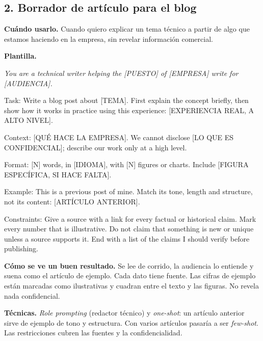 \documentclass[11pt,letterpaper]{article}
\newenvironment{prompt}{%
  \begin{center}\begin{minipage}{0.92\textwidth}\color{black!80}\small
  \setlength{\parskip}{0.4em}\itshape}{%
  \end{minipage}\end{center}}
\newcommand{\entrada}[5]{%
  \subsection*{#1}
  \textbf{Cuándo usarlo.} #2

  \textbf{Plantilla.}
  \begin{prompt}#3\end{prompt}

  \textbf{Cómo se ve un buen resultado.} #4

  \textbf{Técnicas.} #5}
\begin{document}
\entrada{2. Borrador de artículo para el blog}
  {Cuando quiero explicar un tema técnico a partir de algo que estamos
  haciendo en la empresa, sin revelar información comercial.}
  {You are a technical writer helping the [PUESTO] of [EMPRESA] write for
  [AUDIENCIA].

  Task: Write a blog post about [TEMA]. First explain the concept briefly,
  then show how it works in practice using this experience: [EXPERIENCIA
  REAL, A ALTO NIVEL].

  Context: [QUÉ HACE LA EMPRESA]. We cannot disclose [LO QUE ES
  CONFIDENCIAL]; describe our work only at a high level.

  Format: [N] words, in [IDIOMA], with [N] figures or charts. Include
  [FIGURA ESPECÍFICA, SI HACE FALTA].

  Example: This is a previous post of mine. Match its tone, length and
  structure, not its content: [ARTÍCULO ANTERIOR].

  Constraints: Give a source with a link for every factual or historical
  claim. Mark every number that is illustrative. Do not claim that something
  is new or unique unless a source supports it. End with a list of the
  claims I should verify before publishing.}
  {Se lee de corrido, la audiencia lo entiende y suena como el artículo de
  ejemplo. Cada dato tiene fuente. Las
  cifras de ejemplo están marcadas como ilustrativas y cuadran entre el
  texto y las figuras. No revela nada confidencial.}
  {\emph{Role prompting} (redactor técnico) y \emph{one-shot}: un artículo
  anterior sirve de ejemplo de tono y estructura. Con varios artículos
  pasaría a ser \emph{few-shot}. Las restricciones cubren las fuentes y la
  confidencialidad.}
\end{document}
